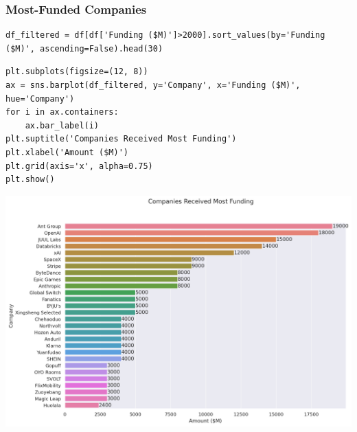 \documentclass[a4paper,12pt]{article}
\begin{document}
\subsubsection{Most-Funded Companies}
\label{sec:org7e384f9}

\begin{verbatim}
df_filtered = df[df['Funding ($M)']>2000].sort_values(by='Funding ($M)', ascending=False).head(30)
\end{verbatim}

\begin{verbatim}
plt.subplots(figsize=(12, 8))
ax = sns.barplot(df_filtered, y='Company', x='Funding ($M)', hue='Company')
for i in ax.containers:
    ax.bar_label(i)
plt.suptitle('Companies Received Most Funding')
plt.xlabel('Amount ($M)')
plt.grid(axis='x', alpha=0.75)
plt.show()
\end{verbatim}

\begin{center}
\includegraphics[width=.9\linewidth]{./.ob-jupyter/fb1eb3db2c42a7fcca21bbc7173378d3b82bc0f4.png}
\label{}
\end{center}
\end{document}
